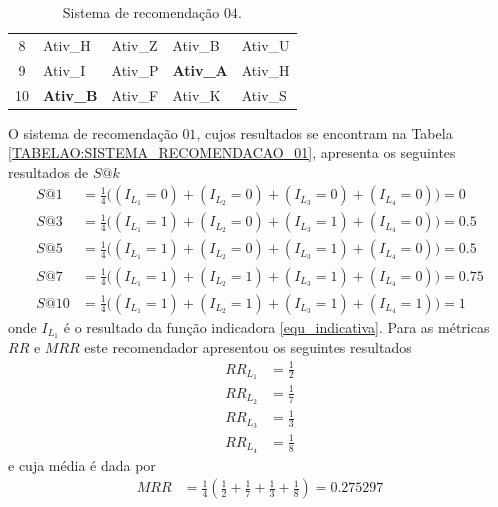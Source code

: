 \begin{table}[!htbp]
\begin{subtable}{.5\linewidth}
\begin{tabular}{cllll}
         		8                & Ativ\_H   			& Ativ\_Z    			& Ativ\_B   		& Ativ\_U	                 \\
         		9                & Ativ\_I    			& Ativ\_P   			& \textbf{Ativ\_A}	& Ativ\_H	                 \\
         		10               & \textbf{Ativ\_B}  	& Ativ\_F    			& Ativ\_K    		& Ativ\_S		     \\ \hline
         		\end{tabular}
         	\caption{Sistema de recomendação \(04\).}
      		\label{TABELAO:SISTEMA_RECOMENDACAO_04}
         \end{subtable}
\label{TABELAO}
\end{table}
O sistema de recomendação \(01\), cujos resultados se encontram na Tabela \ref{TABELAO:SISTEMA_RECOMENDACAO_01}, apresenta os seguintes resultados de \(S@k\)
\begin{align}
S@1 &= \frac{1}{4}  \Big( (I_{L_{1}} = 0) + (I_{L_{2}} = 0) + (I_{L_{3}} = 0) + (I_{L_{4}} = 0) \Big)	=	0		\\
S@3 &= \frac{1}{4}  \Big( (I_{L_{1}} = 1) + (I_{L_{2}} = 0) + (I_{L_{3}} = 1) + (I_{L_{4}} = 0) \Big)	=	0.5		\\
S@5 &= \frac{1}{4}  \Big( (I_{L_{1}} = 1) + (I_{L_{2}} = 0) + (I_{L_{3}} = 1) + (I_{L_{4}} = 0) \Big)	=	0.5		\\
S@7 &= \frac{1}{4}  \Big( (I_{L_{1}} = 1) + (I_{L_{2}} = 1) + (I_{L_{3}} = 1) + (I_{L_{4}} = 0) \Big)	=	0.75	\\
S@10 &= \frac{1}{4} \Big( (I_{L_{1}} = 1) + (I_{L_{2}} = 1) + (I_{L_{3}} = 1) + (I_{L_{4}} = 1) \Big) 	=	1		
\end{align}
onde \(I_{L_{1}}\) é o resultado da função indicadora \eqref{equ_indicativa}. Para as métricas \(RR\) e \(MRR\) este recomendador apresentou os seguintes resultados
\begin{align}
RR_{L_{1}} &= \frac{1}{2}		\\
RR_{L_{2}} &= \frac{1}{7}		\\
RR_{L_{3}} &= \frac{1}{3}		\\
RR_{L_{4}} &= \frac{1}{8}		
\end{align}
e cuja média é dada por 
\begin{align}
MRR &= \frac{1}{4} \left( \frac{1}{2} + \frac{1}{7} + \frac{1}{3} + \frac{1}{8} \right) = 0.275297
\end{align}


